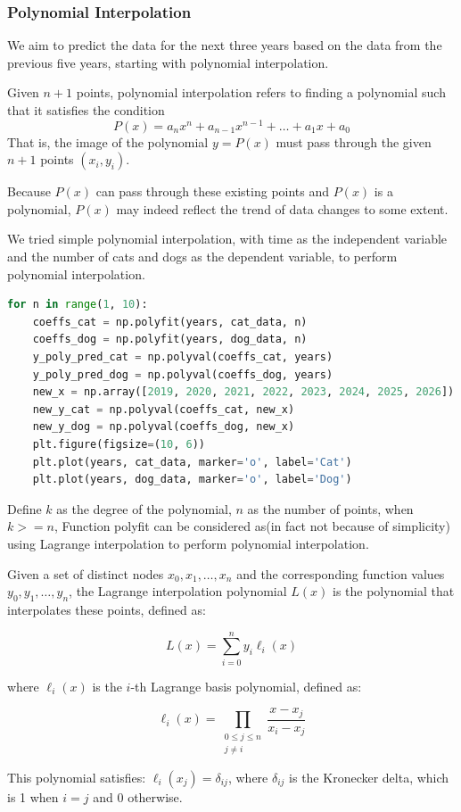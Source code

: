 \documentclass[withoutpreface,bwprint]{cumcmthesis} %
\begin{document}
\subsubsection{Polynomial Interpolation}
\par We aim to predict the data for the next three years based on the data from the previous five years, starting with polynomial interpolation.
\begin{definition}
Given \( n+1 \) points, polynomial interpolation refers to finding a polynomial such that it satisfies the condition
\[
    P(x) = a_n x^n + a_{n-1} x^{n-1} + \dots + a_1 x + a_0
\]
That is, the image of the polynomial \( y = P(x) \) must pass through the given \( n+1 \) points \( (x_i, y_i) \).
\end{definition}
\par Because \( P(x) \) can pass through these existing points and \( P(x) \) is a polynomial, \( P(x) \) may indeed reflect the trend of data changes to some extent.
\par We tried simple polynomial interpolation, with time as the independent variable and the number of cats and dogs as the dependent variable, to perform polynomial interpolation.
\begin{lstlisting}[language=python]
for n in range(1, 10):
    coeffs_cat = np.polyfit(years, cat_data, n)
    coeffs_dog = np.polyfit(years, dog_data, n)
    y_poly_pred_cat = np.polyval(coeffs_cat, years)
    y_poly_pred_dog = np.polyval(coeffs_dog, years)
    new_x = np.array([2019, 2020, 2021, 2022, 2023, 2024, 2025, 2026])
    new_y_cat = np.polyval(coeffs_cat, new_x)
    new_y_dog = np.polyval(coeffs_dog, new_x)
    plt.figure(figsize=(10, 6))
    plt.plot(years, cat_data, marker='o', label='Cat')
    plt.plot(years, dog_data, marker='o', label='Dog')
\end{lstlisting}
\par Define \( k \) as the degree of the polynomial, \( n \) as the number of points, when \( k >= n \), Function polyfit can be considered as(in fact not because of simplicity) using Lagrange interpolation to perform polynomial interpolation.
\begin{definition}
    Given a set of distinct nodes \( x_0, x_1, \dots, x_n \) and the corresponding function values \( y_0, y_1, \dots, y_n \), the Lagrange interpolation polynomial \( L(x) \) is the polynomial that interpolates these points, defined as:

    \[
    L(x) = \sum_{i=0}^{n} y_i \ell_i(x)
    \]
    
    where \( \ell_i(x) \) is the \( i \)-th Lagrange basis polynomial, defined as:
    
    \[
    \ell_i(x) = \prod_{\substack{0 \leq j \leq n \\ j \neq i}} \frac{x - x_j}{x_i - x_j}
    \]
    
    This polynomial satisfies: \( \ell_i(x_j) = \delta_{ij} \), where \( \delta_{ij} \) is the Kronecker delta, which is 1 when \( i = j \) and 0 otherwise.
    
\end{definition}
\end{document}

